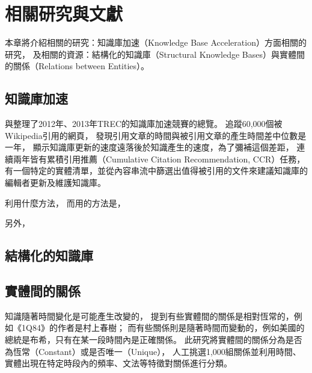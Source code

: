 %
%
%
\chapter{相關研究與文獻}
\label{c:related}

本章將介紹相關的研究：知識庫加速（Knowledge Base Acceleration）方面相關的研究，
及相關的資源：結構化的知識庫（Structural Knowledge Bases）與實體間的關係（Relations between Entities）。

%
%
\section{知識庫加速}

\cite{kba2012}與\cite{kba2013}整理了2012年、2013年TREC的知識庫加速競賽的總覽。
\cite{kba2012}追蹤60,000個被Wikipedia引用的網頁，
發現引用文章的時間與被引用文章的產生時間差中位數是一年，
顯示知識庫更新的速度遠落後於知識產生的速度，為了彌補這個差距，
連續兩年皆有累積引用推薦（Cumulative Citation Recommendation, CCR）任務，   %
有一個特定的實體清單，並從內容串流中篩選出值得被引用的文件來建議知識庫的編輯者更新及維護知識庫。



\cite{kba-hltoce}利用什麼方法，
而\cite{kba-msra}用的方法是，

另外，\cite{kba-entity-detection}

%
%
\section{結構化的知識庫}

\cite{freebase}
\cite{dbpedia}
\cite{yago}

%
%
\section{實體間的關係}

知識隨著時間變化是可能產生改變的，
\cite{relationsByTime} 提到有些實體間的關係是相對恆常的，例如《1Q84》的作者是村上春樹；
而有些關係則是隨著時間而變動的，例如美國的總統是布希，只有在某一段時間內是正確關係。
此研究將實體間的關係分為是否為恆常（Constant）或是否唯一（Unique），
人工挑選1,000組關係並利用時間、實體出現在特定時段內的頻率、文法等特徵對關係進行分類。

